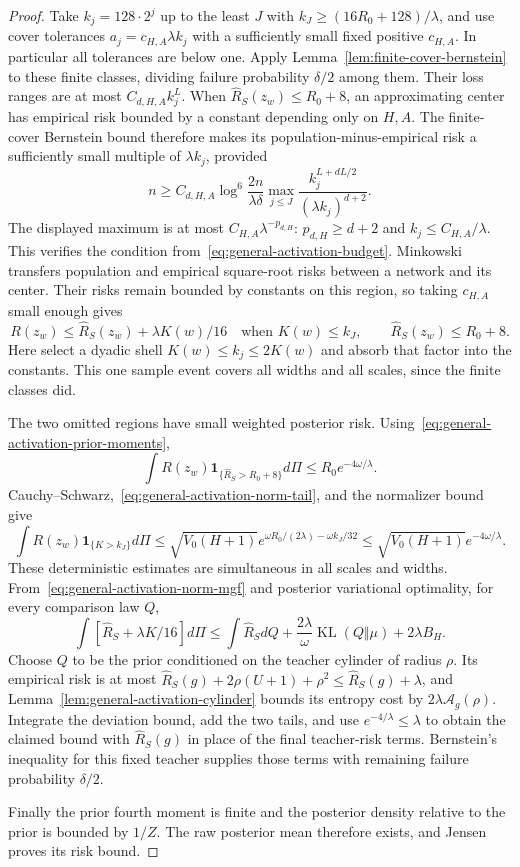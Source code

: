 \begin{proof}
Take $k_j=128\cdot2^j$ up to the least $J$ with
$k_J\geq(16R_0+128)/\lambda$, and use cover tolerances
$a_j=c_{H,A}\lambda k_j$ with a sufficiently small fixed positive
$c_{H,A}$.  In particular all tolerances are below one.
Apply Lemma~\ref{lem:finite-cover-bernstein} to these finite classes,
dividing failure probability $\delta/2$ among them. Their loss ranges
are at most $C_{d,H,A}k_j^L$.
When $\widehat R_S(z_w)\leq R_0+8$, an approximating center has
empirical risk bounded by a constant depending only on $H,A$.
The finite-cover Bernstein bound therefore makes its population-minus-empirical
risk a sufficiently small multiple of $\lambda k_j$, provided
\[
 n\geq C_{d,H,A}\log^6\!\frac{2n}{\lambda\delta}
    \max_{j\leq J}
       \frac{k_j^{L+dL/2}}{(\lambda k_j)^{d+2}}.
\]
The displayed maximum is at most $C_{H,A}\lambda^{-p_{d,H}}$:
$p_{d,H}\geq d+2$ and $k_j\leq C_{H,A}/\lambda$.
This verifies the condition from~\eqref{eq:general-activation-budget}.
Minkowski transfers population and empirical square-root risks between
a network and its center.  Their risks remain bounded by constants on
this region, so taking $c_{H,A}$ small enough gives
\[
 R(z_w)\leq\widehat R_S(z_w)+\lambda K(w)/16
 \quad\text{when }K(w)\leq k_J,\qquad
                       \widehat R_S(z_w)\leq R_0+8.
\]
Here select a dyadic shell $K(w)\leq k_j\leq2K(w)$ and absorb that
factor into the constants.  This one sample event covers all widths
and all scales, since the finite classes did.

The two omitted regions have small weighted posterior risk.
Using~\eqref{eq:general-activation-prior-moments},
\[
 \int R(z_w)\mathbf1_{\{\widehat R_S>R_0+8\}}d\Pi
 \leq R_0e^{-4\omega/\lambda}.
\]
Cauchy--Schwarz,~\eqref{eq:general-activation-norm-tail}, and the
normalizer bound give
\[
 \int R(z_w)\mathbf1_{\{K>k_J\}}d\Pi
 \leq\sqrt{V_0(H+1)}
     e^{\omega R_0/(2\lambda)-\omega k_J/32}
 \leq\sqrt{V_0(H+1)}e^{-4\omega/\lambda}.
\]
These deterministic estimates are simultaneous in all scales and
widths.  From~\eqref{eq:general-activation-norm-mgf} and posterior
variational optimality, for every comparison law $Q$,
\[
 \int[\widehat R_S+\lambda K/16]d\Pi
 \leq\int\widehat R_SdQ+
          \frac{2\lambda}\omega\operatorname{KL}(Q\Vert\mu)
          +2\lambda B_H.
\]
Choose $Q$ to be the prior conditioned on the teacher cylinder of
radius $\rho$.  Its empirical risk is at most
$\widehat R_S(g)+2\rho(U+1)+\rho^2\leq\widehat R_S(g)+\lambda$,
and Lemma~\ref{lem:general-activation-cylinder} bounds its entropy cost
by $2\lambda\mathcal A_g(\rho)$.
Integrate the deviation bound, add the two tails, and use
$e^{-4/\lambda}\leq\lambda$ to obtain the claimed bound with
$\widehat R_S(g)$ in place of the final teacher-risk terms.
Bernstein's inequality for this fixed teacher supplies those terms
with remaining failure probability $\delta/2$.

Finally the prior fourth moment is finite and the posterior density
relative to the prior is bounded by $1/Z$.  The raw posterior mean
therefore exists, and Jensen proves its risk bound.
\end{proof}

